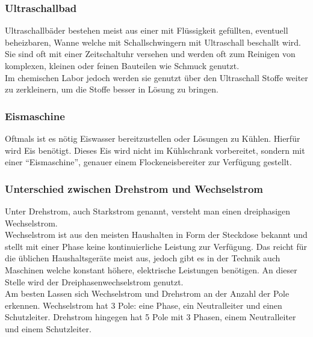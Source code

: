 \subsubsection*{Ultraschallbad}
Ultraschallbäder bestehen meist aus einer mit Flüssigkeit gefüllten, eventuell beheizbaren, Wanne welche mit Schallschwingern mit Ultraschall beschallt wird. Sie sind oft mit einer Zeitschaltuhr versehen und werden oft zum Reinigen von komplexen, kleinen oder feinen Bauteilen wie Schmuck genutzt. \\
Im chemischen Labor jedoch werden sie genutzt über den Ultraschall Stoffe weiter zu zerkleinern, um die Stoffe besser in Lösung zu bringen.

\subsubsection*{Eismaschine}
Oftmals ist es nötig Eiswasser bereitzustellen oder Lösungen zu Kühlen. Hierfür wird Eis benötigt. Dieses Eis wird nicht im Kühlschrank vorbereitet, sondern mit einer "`Eismaschine"', genauer einem Flockeneisbereiter zur Verfügung gestellt.

\subsubsection*{Unterschied zwischen Drehstrom und Wechselstrom}
Unter Drehstrom, auch Starkstrom genannt, versteht man einen dreiphasigen Wechselstrom.\\
Wechselstrom ist aus den meisten Haushalten in Form der Steckdose bekannt und stellt mit einer Phase keine kontinuierliche Leistung zur Verfügung. Das reicht für die üblichen Haushaltsgeräte meist aus, jedoch gibt es in der Technik auch Maschinen welche konstant höhere, elektrische Leistungen benötigen. An dieser Stelle wird der Dreiphasenwechselstrom genutzt.\\
Am besten Lassen sich Wechselstrom und Drehstrom an der Anzahl der Pole erkennen. Wechselstrom hat 3 Pole: eine Phase, ein Neutralleiter und einen Schutzleiter. Drehstrom hingegen hat 5 Pole mit 3 Phasen, einem Neutralleiter und einem Schutzleiter.

\begin{figure}[h!]
	\begin{minipage}[t]{0.45\textwidth}
	\end{minipage}
	\hfill
	\hspace{1mm}
	\begin{minipage}[t]{0.45\textwidth}
	\end{minipage}
\end{figure}
\FloatBarrier

